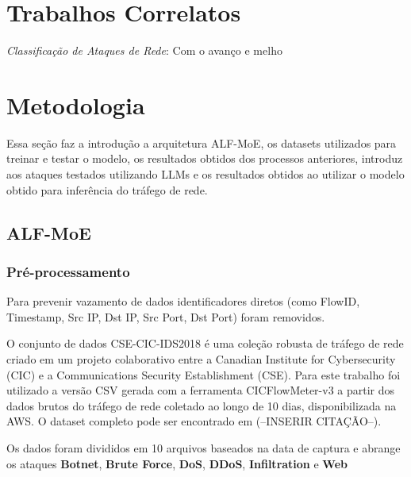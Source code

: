 
\section{Trabalhos Correlatos}

\par{

  \enumerate

    \item \emph{Classificação de Ataques de Rede}:
      Com o avanço e melho

  \endenumerate

}

\section{Metodologia}

Essa seção faz a introdução a arquitetura ALF-MoE, os datasets utilizados para treinar e testar o modelo, os resultados obtidos dos processos anteriores, introduz aos ataques testados utilizando LLMs e os resultados obtidos ao utilizar o modelo obtido para inferência do tráfego de rede.

\subsection{ALF-MoE}

\subsubsection{Pré-processamento}

Para prevenir vazamento de dados identificadores diretos (como FlowID, Timestamp, Src IP, Dst IP, Src Port, Dst Port) foram removidos.

\par{
    O conjunto de dados CSE-CIC-IDS2018 é uma coleção robusta de tráfego de rede criado em um projeto colaborativo entre a Canadian Institute for Cybersecurity (CIC) e a Communications Security Establishment (CSE). Para este trabalho foi utilizado a versão CSV gerada com a ferramenta CICFlowMeter-v3 a partir dos dados brutos do tráfego de rede coletado ao longo de 10 dias, disponibilizada na AWS. O dataset completo pode ser encontrado em (--INSERIR CITAÇÃO--).
}
\par{
    Os dados foram divididos em 10 arquivos baseados na data de captura e abrange os ataques \textbf{Botnet}, \textbf{Brute Force}, \textbf{DoS}, \textbf{DDoS}, \textbf{Infiltration} e \textbf{Web}
}



